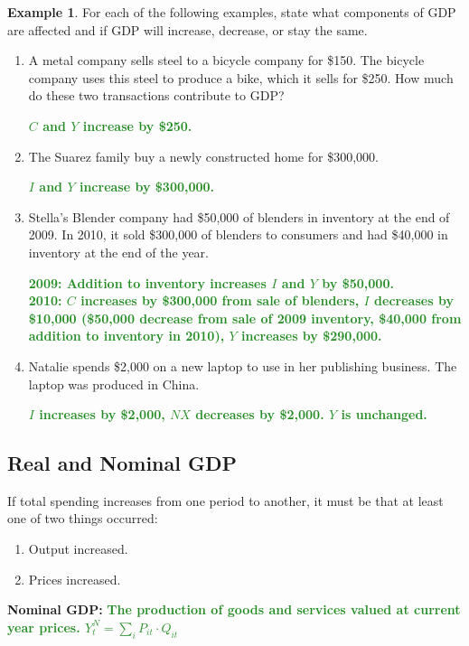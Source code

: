 \documentclass[11pt]{article}\usepackage[]{graphicx}\usepackage[]{color}
\theoremstyle{definition}
\newtheorem{exmp}{Example}[section]
\newcommand{\blank}[1]{}
\newcommand{\ddp}[1]{{\textbf{\textcolor{ForestGreen}{#1}}}}
\newcommand{\defn}[1]{\textbf{#1}}
\begin{document}
\begin{exmp}
	
	For each of the following examples, state what components of GDP are affected and if GDP will increase, decrease, or stay the same. 

\begin{enumerate}
 \setlength{\itemsep}{1em}
\item	A metal company sells steel to a bicycle company for \$150. The bicycle company uses this steel to produce a bike, which it sells for \$250. How much do these two transactions contribute to GDP?

\ddp{$C$ and $Y$ increase by \$250.}

\item	The Suarez family buy a newly constructed home for \$300,000. 

\ddp{$I$ and $Y$ increase by \$300,000.}

\item	Stella's Blender company had \$50,000 of blenders in inventory at the end of 2009. In 2010, it sold \$300,000 of blenders to consumers and had \$40,000 in inventory at the end of the year. 
\blank{}
\ddp{2009: Addition to inventory increases $I$ and $Y$ by \$50,000. \\
	2010: $C$ increases by \$300,000 from sale of blenders, $I$ decreases by \$10,000 (\$50,000 decrease from sale of 2009 inventory, \$40,000 from addition to inventory in 2010), $Y$ increases by \$290,000.}

\item Natalie spends \$2,000 on a new laptop to use in her publishing business. The laptop was produced in China.

\ddp{$I$ increases by \$2,000, $NX$ decreases by \$2,000. $Y$ is unchanged.}
\end{enumerate}
\end{exmp}

\subsection{Real and Nominal GDP}

If total spending increases from one period to another, it must be that at least one of two things occurred:
\begin{enumerate}
	\item Output increased.
	\item Prices increased.
\end{enumerate}

\defn{Nominal GDP:} \ddp{The production of goods and services valued at current year prices. $Y_t^N = \sum_i P_{it} \cdot Q_{it}$\\} 
\end{document}
